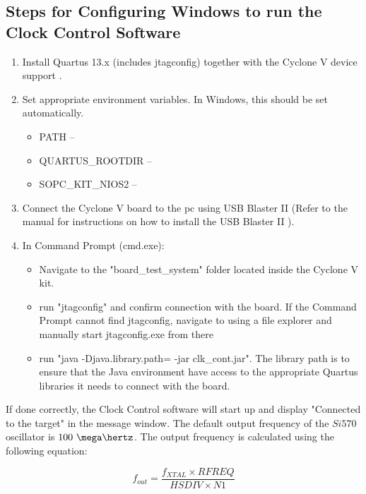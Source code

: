 \documentclass[main.tex]{subfiles}
\begin{document}
\subsection{Steps for Configuring Windows to run the Clock Control Software}

\begin{enumerate}\setlength{\itemsep}{10pt}
  \item Install Quartus 13.x (includes jtagconfig) together with the Cyclone V device support \cite{altera_q13}.
  \item Set appropriate environment variables. In Windows, this should be set automatically.
  \begin{itemize}\setlength{\itemsep}{10pt}
      \item PATH -- 
      \item QUARTUS\_ROOTDIR -- 
      \item SOPC\_KIT\_NIOS2 -- 
    \end{itemize}
  \item Connect the Cyclone V board to the \gls{pc} using USB Blaster II (Refer to the manual for instructions on how to install the USB Blaster II \cite{altera_usb}).
  \item In Command Prompt (cmd.exe):
  \begin{itemize}\setlength{\itemsep}{10pt}
      \item Navigate to the "board\_test\_system" folder located inside the Cyclone V kit.
      \item run "jtagconfig" and confirm connection with the board. If the Command Prompt cannot find jtagconfig, navigate to  using a file explorer and manually start jtagconfig.exe from there
      \item run "java -Djava.library.path= -jar clk\_cont.jar". The library path is to ensure that the Java environment have access to the appropriate Quartus libraries it needs to connect with the board.
    \end{itemize}
\end{enumerate}

If done correctly, the Clock Control software will start up and display "Connected to the target" in the message window. The default output frequency of the $Si570$ oscillator is $100~\mega\hertz$. The output frequency is calculated using the following equation:

\begin{equation}
    f_{out} = \frac{f_{XTAL} \times RFREQ}{HSDIV \times N1}
\end{equation} 
\end{document}
